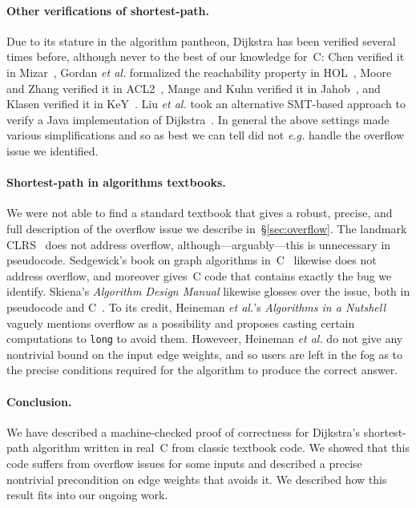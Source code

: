 \paragraph{Other verifications of shortest-path.}
Due to its stature in the algorithm pantheon, Dijkstra has been verified several times before, although never to the best of our knowledge for~C: Chen verified it in Mizar~\cite{chen2003dijkstra}, Gordan \emph{et al.} formalized the reachability property in HOL~\cite{gordon2003executing}, Moore and Zhang verified it in ACL2~\cite{Moore2005}, Mange and Kuhn verified it in Jahob~\cite{mange2007verifying}, and Klasen verified it in KeY~\cite{klasen2010verifying}.  Liu \emph{et al.} took an alternative SMT-based approach to verify a Java implementation of Dijkstra~\cite{6200101}.  In general the above settings made various simplifications and so as best we can tell did not \emph{e.g.} handle the overflow issue we identified.

\paragraph{Shortest-path in algorithms textbooks.}  
We were not able to find a standard textbook that gives a robust, precise,
and full description of the overflow issue we describe in~\S\ref{sec:overflow}.
The landmark CLRS~\cite{clrs} does not address overflow, although---arguably---this is unnecessary in pseudocode.  Sedgewick's book on graph algorithms in~C~\cite{robert2002algorithms} likewise does not address overflow, and moreover gives~C code
that contains exactly the bug we identify.  Skiena's \emph{Algorithm Design Manual} likewise 
glosses over the issue, both
in pseudocode and C~\cite{DBLP:books/daglib/0022194}.
To its credit, Heineman \emph{et al.}'s \emph{Algorithms in a Nutshell}~\cite{heineman2008algorithms} vaguely mentions overflow as a possibility and 
proposes casting certain computations to \texttt{long} to avoid them.  Howeveer, Heineman 
\emph{et al.} do not give any
nontrivial bound on the input edge weights, and so users are left in the fog as to the precise
conditions required for the algorithm to produce the correct answer.





\paragraph{Conclusion.}
We have described a machine-checked proof of correctness for Dijkstra’s 
shortest-path algorithm written in real~C from classic textbook code.
We showed that this code suffers from overflow issues for some 
inputs and described a precise nontrivial precondition on edge weights that 
avoids it.  We described how this result fits into our ongoing work.
